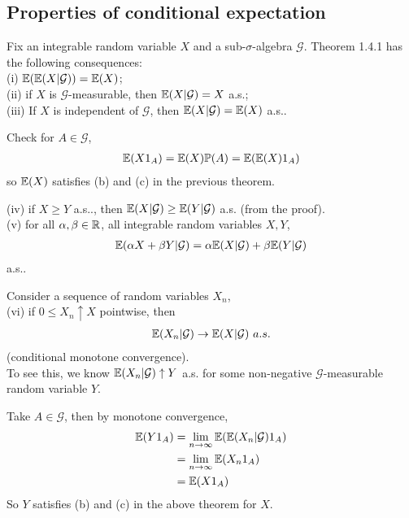 \documentclass[a4paper]{article}
\begin{document}
\subsection{Properties of conditional expectation}
Fix an integrable random variable $X$ and a sub-$\sigma$-algebra $\mathcal{G}$. Theorem 1.4.1 has the following consequences:\\
(i) $\mathbb{E}(\mathbb{E}(X|\mathcal{G})) = \mathbb{E}(X)$;\\
(ii) if $X$ is $\mathcal{G}$-measurable, then $\mathbb{E}(X|\mathcal{G}) = X$ a.s.;\\
(iii) If $X$ is independent of $\mathcal{G}$, then $\mathbb{E}(X|\mathcal{G}) = \mathbb{E}(X)$ a.s..

Check for $A \in \mathcal{G}$, 
\begin{equation*}
    \begin{aligned}
        \mathbb{E}(X 1_A) = \mathbb{E}(X)\mathbb{P}(A) = \mathbb{E}(\mathbb{E}(X)1_A)
    \end{aligned}
\end{equation*}
so $\mathbb{E}(X)$ satisfies (b) and (c) in the previous theorem.

(iv) if $X \geq Y$ a.s.., then $\mathbb{E}(X|\mathcal{G}) \geq \mathbb{E}(Y|\mathcal{G})$ a.s. (from the proof).\\
(v) for all $\alpha,\beta \in \mathbb{R}$, all integrable random variables $X,Y$,
\begin{equation*}
    \begin{aligned}
        \mathbb{E}(\alpha X + \beta Y | \mathcal{G}) = \alpha\mathbb{E}(X|\mathcal{G})+\beta\mathbb{E}(Y|\mathcal{G})
    \end{aligned}
\end{equation*}
a.s..

Consider a sequence of random variables $X_n$,\\
(vi) if $0 \leq X_n \uparrow X$ pointwise, then 
\begin{equation*}
    \begin{aligned}
        \mathbb{E}(X_n|\mathcal{G}) \to \mathbb{E}(X|\mathcal{G}) \ a.s.
    \end{aligned}
\end{equation*}
(conditional monotone convergence).\\
To see this, we know $\mathbb{E}(X_n|\mathcal{G}) \uparrow Y$ a.s. for some non-negative $\mathcal{G}$-measurable random variable $Y$.

Take $A \in \mathcal{G}$, then by monotone convergence,
\begin{equation*}
    \begin{aligned}
        \mathbb{E}(Y 1_A) &= \lim_{n \to \infty} \mathbb{E}(\mathbb{E}(X_n | \mathcal{G})1_A)\\
        &= \lim_{n \to \infty} \mathbb{E}(X_n 1_A)\\
        &= \mathbb{E}(X 1_A)
    \end{aligned}
\end{equation*}
So $Y$ satisfies (b) and (c) in the above theorem for $X$.
\end{document}
